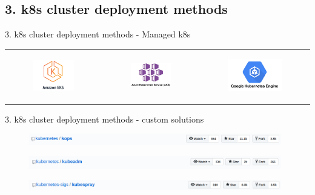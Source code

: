\documentclass{beamer}
\begin{document}
\subsection{3. k8s cluster deployment methods}
\begin{frame}{3. k8s cluster deployment methods - Managed k8s}%
\begin{center}
	\begin{tabular}{ c c c}
		\begin{figure}
			\includegraphics[width=3cm]{figures/managed-aws-eks.png}
			\label{fig:managed-aws-eks}
		\end{figure} &
		\begin{figure}
			\includegraphics[width=3cm]{figures/managed-azure-kubernetes-service-aks.png}
			\label{fig:managed-azure-kubernetes-service-aks}
		\end{figure} &
		\begin{figure}
			\includegraphics[width=4cm]{figures/managed-gcp-gke.png}
			\label{fig:managed-gcp-gke}
		\end{figure}
	\end{tabular}
\end{center}
\end{frame}


\begin{frame}{3. k8s cluster deployment methods - custom solutions}%
\begin{figure}
	\includegraphics[width=11cm]{figures/custom-kops.png}
	\label{fig:custom-kops}
\end{figure}
\begin{figure}
	\includegraphics[width=11cm]{figures/custom-kubeadm.png}
	\label{fig:custom-kubeadm}
\end{figure}
\begin{figure}
	\includegraphics[width=11cm]{figures/custom-kubespray.png}
	\label{fig:custom-kubespray}
\end{figure}
\end{frame}
\end{document}
